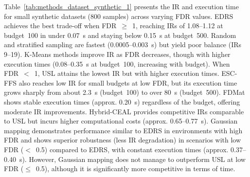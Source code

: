 \documentclass[preprint,12pt]{elsarticle}
\begin{document}
Table~\ref{tab:methods_dataset_synthetic_1} presents {\color{blue}the} IR and execution time {\color{blue}for small synthetic datasets (800 samples) across} varying FDR values. EDRS achieves the best trade-off when FDR~$\geq$~1, reaching IRs of 1.08–1.12 at budget~100 in under 0.07~s and staying below 0.15~s at budget~500. Random and stratified sampling are fastest (0.0005–0.003~s) but yield poor balance (IRs 9–19). K-Means methods improve IR as FDR decreases, though with higher execution times (0.08–0.35~s at budget~100, increasing with budget). When FDR~$<$~1, USL attains the lowest IR but with higher execution times. ESC-FFS also reaches low IR for small budgets at low FDR, but its execution time grows sharply from about 2.3~s (budget~100) to over 80~s (budget~500). FDMat shows stable execution times (approx. 0.20~s) regardless of the budget, offering moderate IR improvements. Hybrid-CEAL provides competitive IRs comparable to USL but incurs higher computational costs (approx. 0.65–0.77~s). Gaussian mapping demonstrates performance similar to EDRS in environments with high FDR and shows superior robustness (less IR degradation) in scenarios with low FDR ($<$~0.5) compared to EDRS, with constant execution times (approx. 0.37–0.40~s). However, Gaussian mapping does not manage to outperform USL at low FDR ($\leq$~0.5), although it is significantly more competitive in terms of time.
\end{document}
